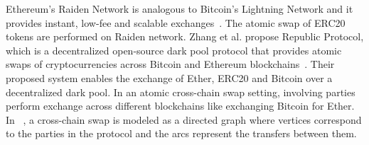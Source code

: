 Ethereum’s Raiden Network is analogous to Bitcoin’s Lightning Network and it provides instant, low-fee and scalable exchanges~\cite{Raiden}. The atomic swap of ERC20 tokens are performed on Raiden network.%
Zhang et al. propose Republic Protocol, which is a decentralized open-source dark pool protocol that provides atomic swaps of cryptocurrencies across Bitcoin and Ethereum blockchains~\cite{zhang2017republic}.%
Their proposed system enables the exchange of Ether, ERC20 and Bitcoin over a decentralized dark pool. %
In an atomic cross-chain swap setting, involving parties perform exchange across different blockchains like exchanging Bitcoin for Ether. In ~\cite{herlihy2018atomic}, a cross-chain swap is modeled as a directed graph where vertices correspond to the parties in the protocol and the arcs represent the transfers between them.

